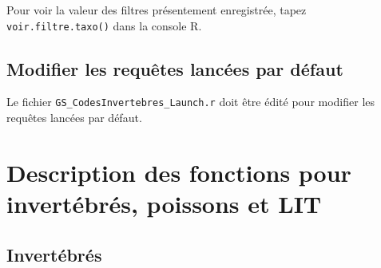 \documentclass{article}
\begin{document}
Pour voir la valeur des filtres présentement enregistrée, tapez
\texttt{voir.filtre.taxo()} dans la console R.

\subsection*{Modifier les requêtes lancées par défaut}
Le fichier \texttt{GS\_CodesInvertebres\_Launch.r} doit être édité
pour modifier les requêtes lancées par défaut.


\section{Description des fonctions pour invertébrés, poissons et LIT}
\subsection{Invertébrés}
\end{document}
